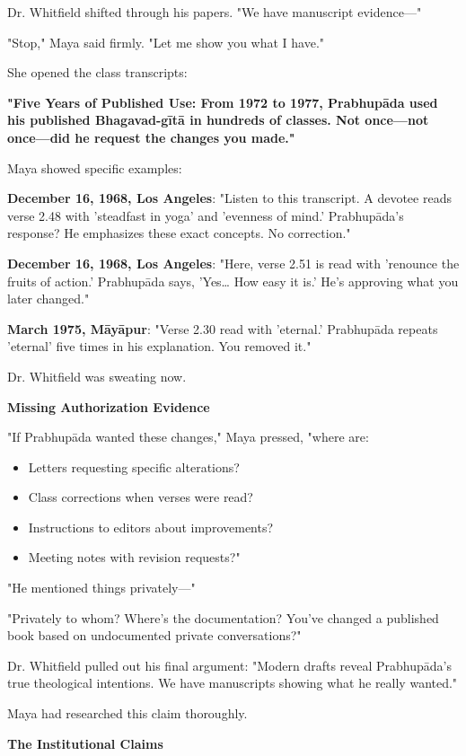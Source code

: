 \documentclass[12pt,twoside]{book}
\begin{document}
Dr. Whitfield shifted through his papers. "We have manuscript evidence—"

"Stop," Maya said firmly. "Let me show you what I have."

She opened the class transcripts:

\textbf{\textbf{"Five Years of Published Use: From 1972 to 1977, Prabhupāda used his published Bhagavad-gītā in hundreds of classes. Not once—not once—did he request the changes you made."}}

Maya showed specific examples:

\textbf{\textbf{December 16, 1968, Los Angeles}}: "Listen to this transcript. A devotee reads verse 2.48 with 'steadfast in yoga' and 'evenness of mind.' Prabhupāda's response? He emphasizes these exact concepts. No correction."

\textbf{\textbf{December 16, 1968, Los Angeles}}: "Here, verse 2.51 is read with 'renounce the fruits of action.' Prabhupāda says, 'Yes\ldots{} How easy it is.' He's approving what you later changed."

\textbf{\textbf{March 1975, Māyāpur}}: "Verse 2.30 read with 'eternal.' Prabhupāda repeats 'eternal' five times in his explanation. You removed it."

Dr. Whitfield was sweating now.

\textbf{\textbf{Missing Authorization Evidence}}

"If Prabhupāda wanted these changes," Maya pressed, "where are:
\begin{itemize}
\item Letters requesting specific alterations?
\item Class corrections when verses were read?
\item Instructions to editors about improvements?
\item Meeting notes with revision requests?"
\end{itemize}

"He mentioned things privately—"

"Privately to whom? Where's the documentation? You've changed a published book based on undocumented private conversations?"

Dr. Whitfield pulled out his final argument: "Modern drafts reveal Prabhupāda's true theological intentions. We have manuscripts showing what he really wanted."

Maya had researched this claim thoroughly.

\textbf{\textbf{The Institutional Claims}}
\end{document}
